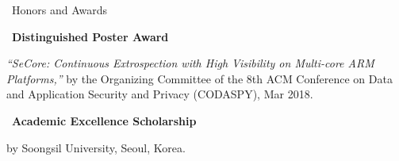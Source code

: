 \documentclass{resume} %
\begin{document}
\begin{rSection}{\faGenderless~Honors and Awards}
	\strut\textbullet~{\bf Distinguished Poster Award}\\
	\strut\hspace{1cm}\parbox[t]{\linegoal}{\emph{``SeCore: Continuous Extrospection with High Visibility on Multi-core ARM Platforms,''} by the Organizing Committee of the 8th ACM Conference on Data and Application Security and Privacy (CODASPY), Mar 2018.}

	\strut\textbullet~{\bf Academic Excellence Scholarship}\\
	\strut\hspace{1cm}by Soongsil University, Seoul, Korea.


	\vspace{3mm}
\end{rSection}

\end{document}
